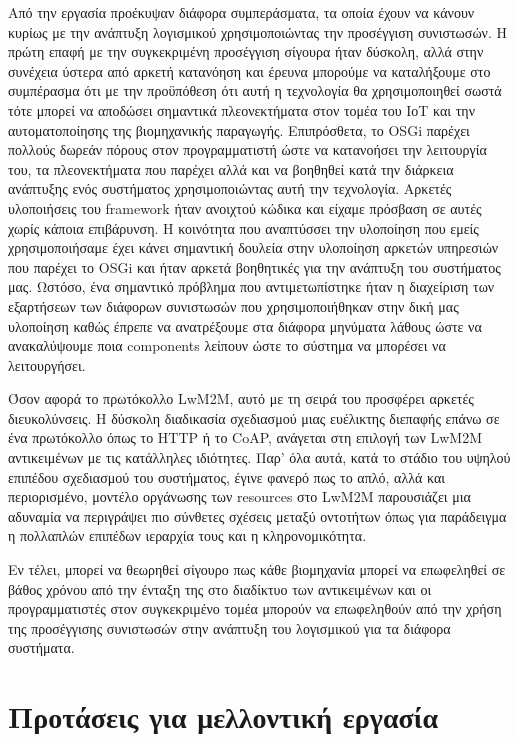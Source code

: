 	Από την εργασία προέκυψαν διάφορα συμπεράσματα, τα οποία έχουν να κάνουν κυρίως με την ανάπτυξη λογισμικού χρησιμοποιώντας την προσέγγιση συνιστωσών. Η πρώτη επαφή με την συγκεκριμένη προσέγγιση σίγουρα ήταν δύσκολη, αλλά στην συνέχεια ύστερα από αρκετή κατανόηση και έρευνα μπορούμε να καταλήξουμε στο συμπέρασμα ότι με την προϋπόθεση ότι αυτή η τεχνολογία θα χρησιμοποιηθεί σωστά τότε μπορεί να αποδώσει  σημαντικά πλεονεκτήματα στον τομέα του ΙοΤ και την αυτοματοποίησης της βιομηχανικής παραγωγής. 
	Επιπρόσθετα, το OSGi παρέχει πολλούς δωρεάν πόρους στον προγραμματιστή ώστε να κατανοήσει την λειτουργία του, τα πλεονεκτήματα που παρέχει αλλά και να βοηθηθεί κατά την διάρκεια ανάπτυξης ενός συστήματος χρησιμοποιώντας αυτή την τεχνολογία. Αρκετές υλοποιήσεις του framework ήταν ανοιχτού κώδικα και είχαμε πρόσβαση σε αυτές χωρίς κάποια επιβάρυνση. Η κοινότητα που αναπτύσσει την υλοποίηση που εμείς χρησιμοποιήσαμε έχει κάνει σημαντική δουλεία στην υλοποίηση αρκετών υπηρεσιών που παρέχει το OSGi και ήταν αρκετά βοηθητικές για την ανάπτυξη του συστήματος μας. Ωστόσο, ένα σημαντικό πρόβλημα που αντιμετωπίστηκε ήταν η διαχείριση των εξαρτήσεων των διάφορων συνιστωσών που χρησιμοποιήθηκαν στην δική μας υλοποίηση καθώς έπρεπε να ανατρέξουμε στα διάφορα μηνύματα λάθους ώστε να ανακαλύψουμε ποια components λείπουν ώστε το σύστημα να μπορέσει να λειτουργήσει. 

	Όσον αφορά το πρωτόκολλο LwM2M, αυτό με τη σειρά του προσφέρει αρκετές διευκολύνσεις. Η δύσκολη διαδικασία σχεδιασμού μιας ευέλικτης διεπαφής επάνω σε ένα πρωτόκολλο όπως το HTTP ή το CoAP, ανάγεται στη επιλογή των LwM2M αντικειμένων με τις κατάλληλες ιδιότητες. Παρ’ όλα αυτά, κατά το στάδιο του υψηλού επιπέδου σχεδιασμού του συστήματος, έγινε φανερό πως το απλό, αλλά και περιορισμένο, μοντέλο οργάνωσης των resources στο LwM2M παρουσιάζει μια αδυναμία να περιγράψει πιο σύνθετες σχέσεις μεταξύ οντοτήτων όπως για παράδειγμα η πολλαπλών επιπέδων ιεραρχία τους και η κληρονομικότητα.

	Εν τέλει, μπορεί να θεωρηθεί σίγουρο πως κάθε βιομηχανία μπορεί να επωφεληθεί σε βάθος χρόνου από την ένταξη της στο διαδίκτυο των αντικειμένων και οι προγραμματιστές στον συγκεκριμένο τομέα μπορούν να επωφεληθούν από την χρήση της προσέγγισης συνιστωσών στην ανάπτυξη του λογισμικού για τα διάφορα συστήματα. 
	
\section{Προτάσεις για μελλοντική εργασία}

